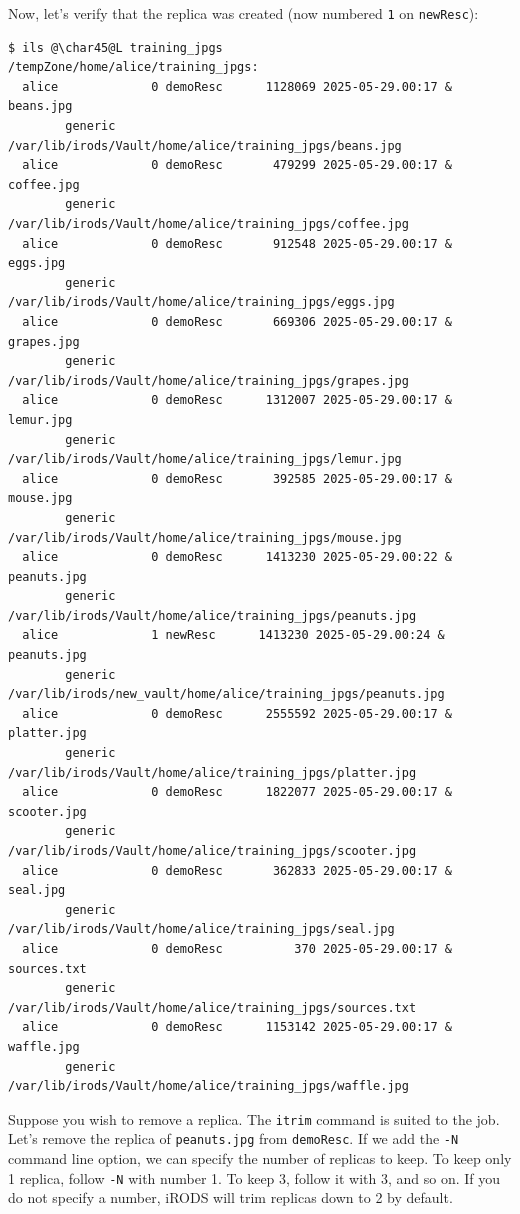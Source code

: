 \documentclass[10pt,oneside]{memoir}
\begin{document}
Now, let's verify that the replica was created (now numbered \texttt{1} on \texttt{newResc}):

\begin{lstlisting}[basicstyle=\tiny\ttfamily]
$ ils @\char45@L training_jpgs
/tempZone/home/alice/training_jpgs:
  alice             0 demoResc      1128069 2025-05-29.00:17 & beans.jpg
        generic    /var/lib/irods/Vault/home/alice/training_jpgs/beans.jpg
  alice             0 demoResc       479299 2025-05-29.00:17 & coffee.jpg
        generic    /var/lib/irods/Vault/home/alice/training_jpgs/coffee.jpg
  alice             0 demoResc       912548 2025-05-29.00:17 & eggs.jpg
        generic    /var/lib/irods/Vault/home/alice/training_jpgs/eggs.jpg
  alice             0 demoResc       669306 2025-05-29.00:17 & grapes.jpg
        generic    /var/lib/irods/Vault/home/alice/training_jpgs/grapes.jpg
  alice             0 demoResc      1312007 2025-05-29.00:17 & lemur.jpg
        generic    /var/lib/irods/Vault/home/alice/training_jpgs/lemur.jpg
  alice             0 demoResc       392585 2025-05-29.00:17 & mouse.jpg
        generic    /var/lib/irods/Vault/home/alice/training_jpgs/mouse.jpg
  alice             0 demoResc      1413230 2025-05-29.00:22 & peanuts.jpg
        generic    /var/lib/irods/Vault/home/alice/training_jpgs/peanuts.jpg
  alice             1 newResc      1413230 2025-05-29.00:24 & peanuts.jpg
        generic    /var/lib/irods/new_vault/home/alice/training_jpgs/peanuts.jpg
  alice             0 demoResc      2555592 2025-05-29.00:17 & platter.jpg
        generic    /var/lib/irods/Vault/home/alice/training_jpgs/platter.jpg
  alice             0 demoResc      1822077 2025-05-29.00:17 & scooter.jpg
        generic    /var/lib/irods/Vault/home/alice/training_jpgs/scooter.jpg
  alice             0 demoResc       362833 2025-05-29.00:17 & seal.jpg
        generic    /var/lib/irods/Vault/home/alice/training_jpgs/seal.jpg
  alice             0 demoResc          370 2025-05-29.00:17 & sources.txt
        generic    /var/lib/irods/Vault/home/alice/training_jpgs/sources.txt
  alice             0 demoResc      1153142 2025-05-29.00:17 & waffle.jpg
        generic    /var/lib/irods/Vault/home/alice/training_jpgs/waffle.jpg
\end{lstlisting}

Suppose you wish to remove a replica. The \texttt{itrim} command is suited to the job. Let's remove the replica of \texttt{peanuts.jpg} from \texttt{demoResc}. If we add the \texttt{-N} command line option, we can specify the number of replicas to keep. To keep only 1 replica, follow \texttt{-N} with number 1. To keep 3, follow it with 3, and so on. If you do not specify a number, iRODS will trim replicas down to 2 by default.
\end{document}
